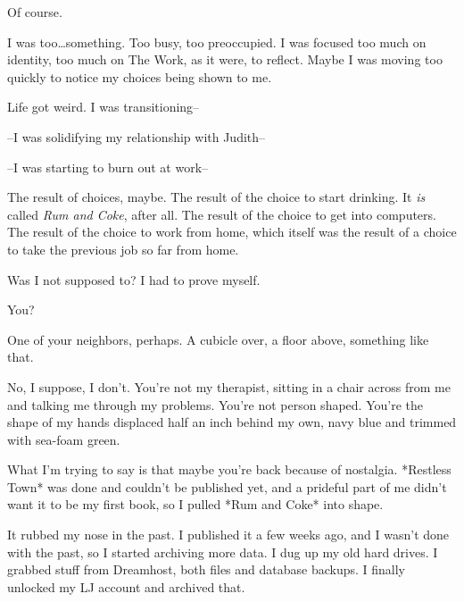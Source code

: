 
Of course.


I was too\ldots{}something. Too busy, too preoccupied. I was focused too much on identity, too much on The Work, as it were, to reflect. Maybe I was moving too quickly to notice my choices being shown to me.


Life got weird. I was transitioning--


--I was solidifying my relationship with Judith--


--I was starting to burn out at work--


The result of choices, maybe. The result of the choice to start drinking. It \emph{is} called \emph{Rum and Coke}, after all. The result of the choice to get into computers. The result of the choice to work from home, which itself was the result of a choice to take the previous job so far from home.


Was I not supposed to? I had to prove myself.


You?


One of your neighbors, perhaps. A cubicle over, a floor above, something like that.


No, I suppose, I don't. You're not my therapist, sitting in a chair across from me and talking me through my problems. You're not person shaped. You're the shape of my hands displaced half an inch behind my own, navy blue and trimmed with sea-foam green.


What I'm trying to say is that maybe you're back because of nostalgia. *Restless Town* was done and couldn't be published yet, and a prideful part of me didn't want it to be my first book, so I pulled *Rum and Coke* into shape.

It rubbed my nose in the past. I published it a few weeks ago, and I wasn't done with the past, so I started archiving more data. I dug up my old hard drives. I grabbed stuff from Dreamhost, both files and database backups. I finally unlocked my LJ account and archived that.

